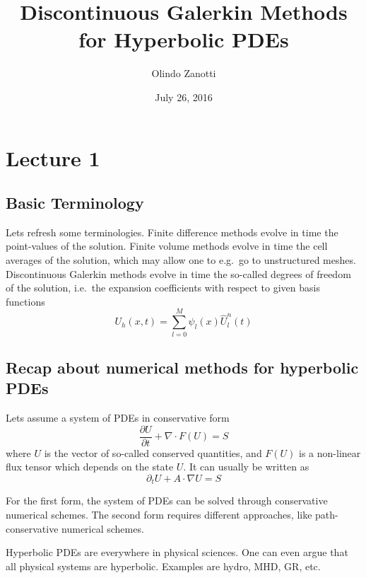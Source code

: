 \documentclass[letterpaper, 11pt]{article}
\numberwithin{equation}{section}
\numberwithin{figure}{section}
\begin{document}
\title{Discontinuous Galerkin Methods for Hyperbolic PDEs}
\author{Olindo Zanotti}
\date{July 26, 2016}

\maketitle

\section{Lecture 1}

\subsection{Basic Terminology}

Lets refresh some terminologies. Finite difference methods evolve in time the
point-values of the solution. Finite volume methods evolve in time the cell
averages of the solution, which may allow one to e.g.\ go to unstructured
meshes. Discontinuous Galerkin methods evolve in time the so-called degrees of
freedom of the solution, i.e.\ the expansion coefficients with respect to given
basis functions
\begin{equation}
  \label{eq:1}
  U_h(x, t) = \sum_{l=0}^M\psi_l(x) \hat{U}^n_l(t)
\end{equation}

\subsection{Recap about numerical methods for hyperbolic PDEs}

Lets assume a system of PDEs in conservative form
\begin{equation}
  \label{eq:2}
  \frac{\partial U}{\partial t} + \nabla\cdot F(U) = S
\end{equation}
where $U$ is the vector of so-called conserved quantities, and $F(U)$ is a
non-linear flux tensor which depends on the state $U$. It can usually be written
as
\begin{equation}
  \label{eq:3}
  \partial_tU + A\cdot \nabla U = S
\end{equation}

For the first form, the system of PDEs can be solved through conservative
numerical schemes. The second form requires different approaches, like
path-conservative numerical schemes.

Hyperbolic PDEs are everywhere in physical sciences. One can even argue that all
physical systems are hyperbolic. Examples are hydro, MHD, GR, etc.
\end{document}
